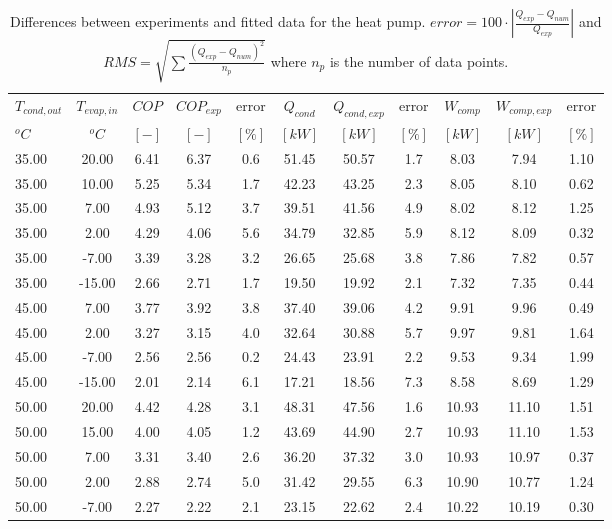 \documentclass[english]{SPFShortReport}
\begin{document}
\begin{table}[!ht]
\begin{small}
\caption{Differences between experiments and fitted data for the heat pump.          $error=100 \cdot |\frac{Q_{exp}-Q_{num}}{Q_{exp}}|$ and $RMS = \sqrt { \sum{\frac{(Q_{exp}-Q_{num})^2}{n_p}} }$ where $n_p$ is the number of data points.}
\begin{center}
\resizebox{12cm}{!} 
{
\begin{tabular}{l | c c c c c c c c c c } 
\hline
\hline
$T_{cond,out}$ &$T_{evap,in}$ &$COP$ &$COP_{exp}$ &error &$Q_{cond}$ &$Q_{cond,exp}$ &error &$W_{comp}$ &$W_{comp,exp}$ &error \\ 
$^oC$ &$^oC$ &$[-]$ &$[-]$ &$[\%]$ &$[kW]$ &$[kW]$ &$[\%]$ &$[kW]$ &$[kW]$ &$[\%]$\\ 
\hline
35.00  & 20.00 & 6.41 & 6.37 & 0.6 & 51.45 & 50.57 & 1.7 & 8.03 & 7.94 & 1.10\\ 
35.00  & 10.00 & 5.25 & 5.34 & 1.7 & 42.23 & 43.25 & 2.3 & 8.05 & 8.10 & 0.62\\ 
35.00  & 7.00 & 4.93 & 5.12 & 3.7 & 39.51 & 41.56 & 4.9 & 8.02 & 8.12 & 1.25\\ 
35.00  & 2.00 & 4.29 & 4.06 & 5.6 & 34.79 & 32.85 & 5.9 & 8.12 & 8.09 & 0.32\\ 
35.00  & -7.00 & 3.39 & 3.28 & 3.2 & 26.65 & 25.68 & 3.8 & 7.86 & 7.82 & 0.57\\ 
35.00  & -15.00 & 2.66 & 2.71 & 1.7 & 19.50 & 19.92 & 2.1 & 7.32 & 7.35 & 0.44\\ 
45.00  & 7.00 & 3.77 & 3.92 & 3.8 & 37.40 & 39.06 & 4.2 & 9.91 & 9.96 & 0.49\\ 
45.00  & 2.00 & 3.27 & 3.15 & 4.0 & 32.64 & 30.88 & 5.7 & 9.97 & 9.81 & 1.64\\ 
45.00  & -7.00 & 2.56 & 2.56 & 0.2 & 24.43 & 23.91 & 2.2 & 9.53 & 9.34 & 1.99\\ 
45.00  & -15.00 & 2.01 & 2.14 & 6.1 & 17.21 & 18.56 & 7.3 & 8.58 & 8.69 & 1.29\\ 
50.00  & 20.00 & 4.42 & 4.28 & 3.1 & 48.31 & 47.56 & 1.6 & 10.93 & 11.10 & 1.51\\ 
50.00  & 15.00 & 4.00 & 4.05 & 1.2 & 43.69 & 44.90 & 2.7 & 10.93 & 11.10 & 1.53\\ 
50.00  & 7.00 & 3.31 & 3.40 & 2.6 & 36.20 & 37.32 & 3.0 & 10.93 & 10.97 & 0.37\\ 
50.00  & 2.00 & 2.88 & 2.74 & 5.0 & 31.42 & 29.55 & 6.3 & 10.90 & 10.77 & 1.24\\ 
50.00  & -7.00 & 2.27 & 2.22 & 2.1 & 23.15 & 22.62 & 2.4 & 10.22 & 10.19 & 0.30\\ 

\end{tabular}}
\end{center}
\end{small}
\end{table}
\end{document}
